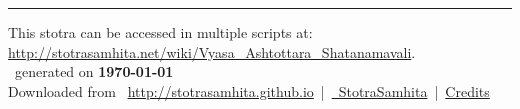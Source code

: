 \documentclass[a5paper,twoside,12pt]{book}
\begin{document}
\setmainfont[Script=Devanagari,Mapping=tex-text]{Sanskrit 2003}
\fontsize {16}{19.25}\selectfont
\let\head\chapt
\begin{center}

\end{center}
\vfill
\centering
\rule{0.8\textwidth}{0.6pt}

\footnotesize
{}\sffamily
This stotra can be accessed in multiple scripts at:\\
\url{http://stotrasamhita.net/wiki/Vyasa_Ashtottara_Shatanamavali}.\\[1ex]
\faFilePdfO~generated on \textbf{\today}\\[1ex]
Downloaded from \faGlobe{}~\url{http://stotrasamhita.github.io}~|~\href{https://github.com/StotraSamhita}{\faGithubSquare{}~StotraSamhita}~|~\href{https://stotrasamhita.github.io/about/}{Credits}
\end{document}

